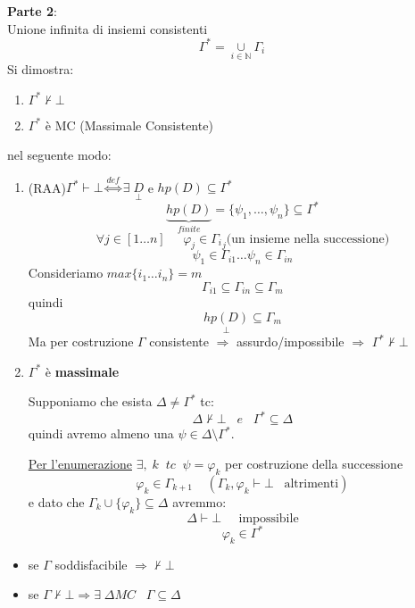 \documentclass{article}
\theoremstyle{break}
\theoremstyle{break}
\theoremstyle{break}
\theoremstyle{break}
\begin{document}
\textbf{Parte 2}:\\
Unione infinita di insiemi consistenti
\[
  \Gamma^* = \underset{i \in \mathbb{N}}{\cup } \Gamma_i
\] 
Si dimostra:
\begin{enumerate}
  \item \( \Gamma^* \not\vdash \bot \) 
  \item \( \Gamma^* \) è MC (Massimale Consistente) 
\end{enumerate}
nel seguente modo:
\begin{enumerate}
  \item (RAA)\( \Gamma^* \vdash \bot \stackrel{def}{\Leftrightarrow} \exists \; \underset{\bot}{D} \) e \( hp(D) \subseteq \Gamma^* \) 
    \[
      \underbrace{hp(D)}_{finite} = \{\psi_1, \ldots, \psi_n\} \subseteq \Gamma^* 
    \] 
    \[
      \forall j \in [1 \ldots n]\;\;\;\;\;\varphi_j \in {\Gamma_i}_j \text{(un insieme nella successione)}
    \] 
    \[
      \psi_1 \in  \Gamma_{i1} \ldots \psi_n \in \Gamma_{in}
    \] 
    Consideriamo \( max \{i_1 \ldots i_n\} = m  \) 
    \[
      \Gamma_{i1} \subseteq \Gamma_{in} \subseteq \Gamma_m
    \] 
    quindi
    \[
      \underset{\bot}{hp(D)} \subseteq \Gamma_{m}
    \] 
    Ma per costruzione \( \Gamma \) consistente \( \Rightarrow \) assurdo/impossibile \( \Rightarrow \) \( \Gamma^* \not\vdash \bot \) 
  \item \( \Gamma^* \) è \textbf{massimale}

    Supponiamo che esista \( \Delta \neq \Gamma^* \) tc:
    \[
    \Delta \not\vdash \bot\;\;\;e\;\;\; \Gamma^* \subseteq \Delta
    \] 
    quindi avremo almeno una \( \psi \in \Delta \setminus \Gamma^* \).

    \underline{Per l'enumerazione} \( \exists,\;k \;\;tc\;\; \psi = \varphi_k \) per costruzione
    della successione
    \[
      \varphi_k \in \Gamma_{k+1} \;\;\;\; (\Gamma_k, \varphi_k \vdash \bot \;\;\; \text{altrimenti})
    \] 
    e dato che \( \Gamma_k \cup \{\varphi_k\} \subseteq \Delta\) avremmo:
    \[
    \Delta \vdash \bot\;\;\;\;\; \text{impossibile}
    \] 
    \[
    \varphi_k \in \Gamma^*
    \] 
\end{enumerate}
\begin{itemize}
  \item se \( \Gamma \) soddisfacibile \( \Rightarrow \not\vdash \bot \) 
  \item se \( \Gamma \not\vdash \bot \Rightarrow \exists \;\Delta MC\;\;\;\Gamma\subseteq \Delta\) 
\end{itemize}
\end{document}

